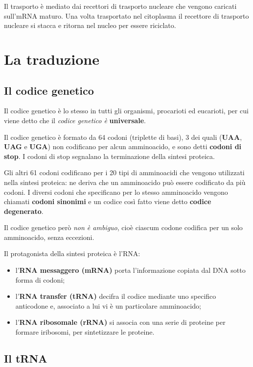 \documentclass[11pt]{book}
\begin{document}
Il trasporto è mediato dai recettori di trasporto nucleare che vengono
caricati sull'mRNA maturo. Una volta trasportato nel citoplasma il
recettore di trasporto nucleare si stacca e ritorna nel nucleo per
essere riciclato.

\section{La traduzione}\label{la-traduzione}

\subsection{Il codice genetico}\label{il-codice-genetico}

Il codice genetico è lo stesso in tutti gli organismi, procarioti ed
eucarioti, per cui viene detto che il \emph{codice genetico è}
\textbf{universale}.

Il codice genetico è formato da 64 codoni (triplette di basi), 3 dei
quali (\textbf{UAA}, \textbf{UAG} e \textbf{UGA}) non codificano per
alcun amminoacido, e sono detti \textbf{codoni di stop}. I codoni di
stop segnalano la terminazione della sintesi proteica.

Gli altri 61 codoni codificano per i 20 tipi di amminoacidi che vengono
utilizzati nella sintesi proteica: ne deriva che un amminoacido può
essere codificato da più codoni. I diversi codoni che specificano per lo
stesso amminoacido vengono chiamati \textbf{codoni sinonimi} e un codice
così fatto viene detto \textbf{codice degenerato}.

Il codice genetico però \emph{non è ambiguo}, cioè ciascum codone
codifica per un solo amminoacido, senza eccezioni.

Il protagonista della sintesi proteica è l'RNA:

\begin{itemize}
\itemsep1pt\parskip0pt
\item
  l'\textbf{RNA messaggero (mRNA)} porta l'informazione copiata dal DNA
  sotto forma di codoni;
\item
  l'\textbf{RNA transfer (tRNA)} decifra il codice mediante uno
  specifico anticodone e, associato a lui vi è un particolare
  amminoacido;
\item
  l'\textbf{RNA ribosomale (rRNA)} si associa con una serie di proteine
  per formare iribosomi, per sintetizzare le proteine.
\end{itemize}

\subsection{Il tRNA}\label{il-trna}
\end{document}
